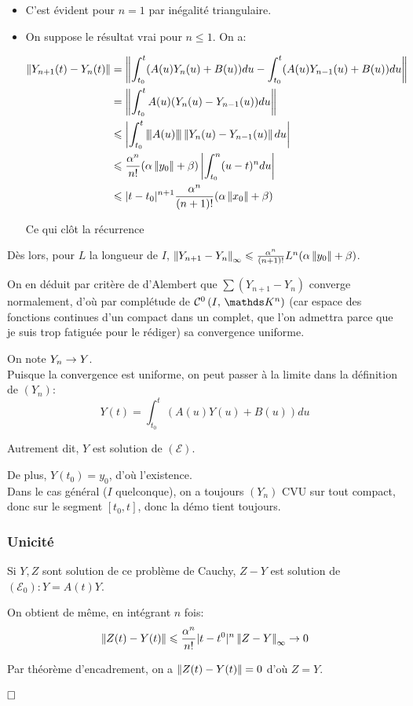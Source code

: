 \documentclass[a4paper, 12pt]{article}
\begin{document}
	\begin{itemize}
		\item C'est évident pour $n=1$ par inégalité triangulaire.
		\item On suppose le résultat vrai pour $n\leqslant 1$. On a:
		
		\begin{align*}
			\norm[Y_{n+1}(t) - Y_n(t)] & = \norm[\int_{t_0}^t (A(u)Y_n(u) + B(u))du - \int_{t_0}^t (A(u)Y_{n-1}(u) + B(u))du] \\
			& = \norm[\int_{t_0}^t A(u)(Y_n(u) - Y_{n-1}(u))du] \\
			& \leqslant \left|\int_{t_0}^t \triple[A(u)]\norm[Y_n(u) - Y_{n-1}(u)]du\right| \\			
			& \leqslant \frac {\alpha^n}{n!}(\alpha\norm[y_0]+\beta) \left|\int_{t_0}^n (u-t)^n du \right| \\
			& \leqslant |t-t_0|^{n+1} \frac {\alpha^n} {(n+1)!} (\alpha \norm[x_0]+\beta)
		\end{align*}
		
		Ce qui clôt la récurrence
	\end{itemize}
	
	Dès lors, pour $L$ la longueur de $I$,  $\norminf[Y_{n+1}-Y_n] \leqslant \frac{\alpha^n}{(n+1)!}L^n (\alpha\norm[y_0]+\beta)$.
	
	On en déduit par critère de d'Alembert que $\sum(Y_{n+1}-Y_n)$ converge normalement, d'où par complétude de $\Co[0]{I}{\K^n}$ (car espace des fonctions continues d'un compact dans un complet, que l'on admettra parce que je suis trop fatiguée pour le rédiger) sa convergence uniforme.
	
	On note $Y_n \cv Y$. \\
	
	Puisque la convergence est uniforme, on peut passer à la limite dans la définition de $(Y_n)$:
	$$Y(t) = \int_{t_0}^t (A(u)Y(u) + B(u)) du$$
	
	Autrement dit, $Y$ est solution de $(\mathcal E)$.
	
	De plus, $Y(t_0) = y_0$, d'où l'existence. \\
	
	Dans le cas général ($I$ quelconque), on a toujours $(Y_n)$ CVU sur tout compact, donc sur le segment $[t_0, t]$, donc la démo tient toujours.
	
	
	\subsubsection*{Unicité}
	
	Si $Y, Z$ sont solution de ce problème de Cauchy, $Z-Y$ est solution de $(\mathcal E_0): Y=A(t)Y$.
	
	On obtient de même, en intégrant $n$ fois:
	$$ \norm[Z(t)-Y(t)] \leqslant \frac {\alpha^n}{n!}|t-t^0|^n \norminf[Z-Y] \cv 0$$
	
	Par théorème d'encadrement, on a $\norm[Z(t)-Y(t)] = 0$ d'où $Z=Y$. 
	
	\fontsize{16}{16}
	\flushright $\LARGE{\square}$
\end{document}
